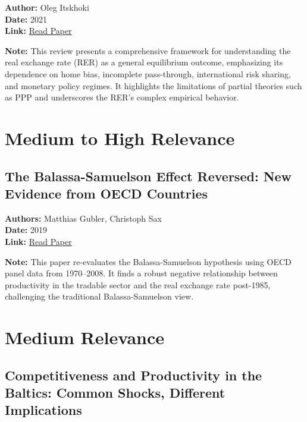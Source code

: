 \documentclass[
  11pt,
]{article}
\begin{document}
\textbf{Author:} Oleg Itskhoki\\
\textbf{Date:} 2021\\
\textbf{Link:}
\href{https://drive.google.com/file/d/1vhVbum9po2xoiaPT8suUqOqjDg5o8EkI/view?usp=sharing}{Read
Paper}

\textbf{Note:} This review presents a comprehensive framework for
understanding the real exchange rate (RER) as a general equilibrium
outcome, emphasizing its dependence on home bias, incomplete
pass-through, international risk sharing, and monetary policy regimes.
It highlights the limitations of partial theories such as PPP and
underscores the RER's complex empirical behavior.

\section{Medium to High Relevance}\label{medium-to-high-relevance}

\subsection{The Balassa-Samuelson Effect Reversed: New Evidence from
OECD
Countries}\label{the-balassa-samuelson-effect-reversed-new-evidence-from-oecd-countries}

\textbf{Authors:} Matthias Gubler, Christoph Sax\\
\textbf{Date:} 2019\\
\textbf{Link:}
\href{https://drive.google.com/file/d/17D8FzoOwr9Z-TulNWzoSWobEIz4HaWuQ/view?usp=sharing}{Read
Paper}

\textbf{Note:} This paper re-evaluates the Balassa-Samuelson hypothesis
using OECD panel data from 1970--2008. It finds a robust negative
relationship between productivity in the tradable sector and the real
exchange rate post-1985, challenging the traditional Balassa-Samuelson
view.

\section{Medium Relevance}\label{medium-relevance}

\subsection{Competitiveness and Productivity in the Baltics: Common
Shocks, Different
Implications}\label{competitiveness-and-productivity-in-the-baltics-common-shocks-different-implications}
\end{document}
